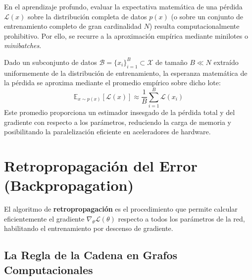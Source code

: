 En el aprendizaje profundo, evaluar la expectativa matemática de una pérdida $\mathcal{L}(x)$ sobre la distribución completa de datos $p(x)$ (o sobre un conjunto de entrenamiento completo de gran cardinalidad $N$) resulta computacionalmente prohibitivo. Por ello, se recurre a la aproximación empírica mediante minilotes o \emph{minibatches}.

Dado un subconjunto de datos $\mathcal{B} = \{x_i\}_{i=1}^B \subset \mathcal{X}$ de tamaño $B \ll N$ extraído uniformemente de la distribución de entrenamiento, la esperanza matemática de la pérdida se aproxima mediante el promedio empírico sobre dicho lote:
\begin{equation}
\label{eq:minibatch_approx}
\mathbb{E}_{x \sim p(x)} [\mathcal{L}(x)] \approx \frac{1}{B} \sum_{i=1}^B \mathcal{L}(x_i)
\end{equation}
Este promedio proporciona un estimador insesgado de la pérdida total y del gradiente con respecto a los parámetros, reduciendo la carga de memoria y posibilitando la paralelización eficiente en aceleradores de hardware.

\section{Retropropagación del Error (Backpropagation)}
\label{sec:backprop}

El algoritmo de \textbf{retropropagación} \cite{rumelhart1986learning} es el procedimiento que permite calcular eficientemente el gradiente $\nabla_\theta \mathcal{L}(\theta)$ respecto a todos los parámetros de la red, habilitando el entrenamiento por descenso de gradiente.

\subsection{La Regla de la Cadena en Grafos Computacionales}
\label{subsec:regla_cadena}

